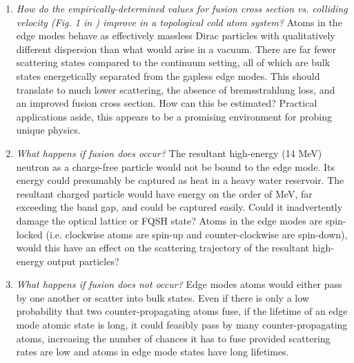 \documentclass[onecolumn,
               superscriptaddress,
               floatfix,
               longbibliography, 
               showkeys,apl]{revtex4-2}
\begin{document}
\begin{enumerate}
\item \textit{How do the empirically-determined values for fusion cross section vs. colliding velocity (Fig. 1 in \cite{MAGLICH1975IEEE}) improve in a topological cold atom system?} Atoms in the edge modes behave as effectively massless Dirac particles with qualitatively different dispersion than what would arise in a vacuum. There are far fewer scattering states compared to the continuum setting, all of which are bulk states energetically separated from the gapless edge modes. This should translate to much lower scattering, the absence of bremsstrahlung loss, and an improved fusion cross section. How can this be estimated? Practical applications aside, this appears to be a promising environment for probing unique physics.
\item \textit{What happens if fusion does occur?} The resultant high-energy (14 MeV) neutron as a charge-free particle would not be bound to the edge mode. Its energy could presumably be captured as heat in a heavy water reservoir. The resultant charged particle would have energy on the order of MeV, far exceeding the band gap, and could be captured easily. Could it inadvertently damage the optical lattice or FQSH state? Atoms in the edge modes are spin-locked (i.e. clockwise atoms are spin-up and counter-clockwise are spin-down), would this have an effect on the scattering trajectory of the resultant high-energy output particles?
\item \textit {What happens if fusion does not occur?} Edge modes atoms would either pass by one another or scatter into bulk states. Even if there is only a low probability that two counter-propagating atoms fuse, if the lifetime of an edge mode atomic state is long, it could feasibly pass by many counter-propagating atoms, increasing the number of chances it has to fuse provided scattering rates are low and atoms in edge mode states have long lifetimes.
\end{enumerate}




%
\end{document}
